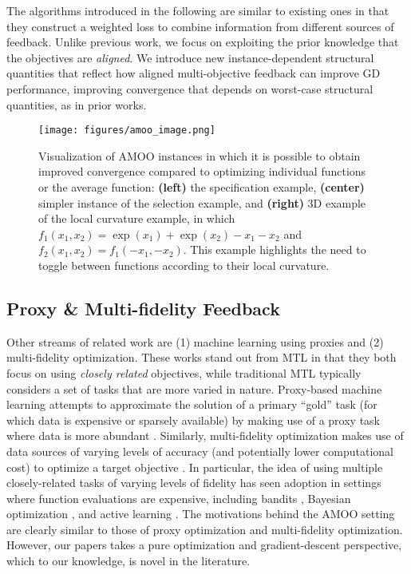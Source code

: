 The algorithms introduced in the following are similar to existing ones in that they construct a weighted loss to combine information from different sources of feedback. Unlike previous work, we focus on exploiting the prior knowledge that the objectives are \emph{aligned}.  We introduce new instance-dependent structural quantities that reflect how aligned multi-objective feedback can improve GD performance, improving convergence that depends on worst-case structural quantities, as in prior works. 


\begin{figure*}[t]
    \centering
    \texttt{[image: figures/amoo\_image.png]}
    \caption{ Visualization of AMOO instances in which it is possible to obtain improved convergence compared to optimizing individual functions or the average function: \textbf{(left)} the specification example, \textbf{(center)} simpler instance of the selection example, and \textbf{(right)} 3D example of the local curvature example, in which $f_1(x_1,x_2)=\exp(x_1)+\exp(x_2)-x_1-x_2$ and $f_2(x_1,x_2)=f_1(-x_1,-x_2)$. This example highlights the need to toggle between functions according to their local curvature.}
    \label{fig:amoo_examples}
\end{figure*}



\subsection{Proxy \& Multi-fidelity Feedback}
Other streams of related work are (1) machine learning using proxies and (2) multi-fidelity optimization. These works stand out from MTL in that they both focus on using \emph{closely related} objectives, while traditional MTL typically considers a set of tasks that are more varied in nature. Proxy-based machine learning attempts to approximate the solution of a primary ``gold'' task (for which data is expensive or sparsely available) by making use of a proxy task where data is more abundant \citep{bastani2021predicting,dzyabura2019accounting}. Similarly, multi-fidelity optimization makes use of data sources of varying levels of accuracy (and potentially lower computational cost) to optimize a target objective \citep{forrester2007multi}. In particular, the idea of using multiple closely-related tasks of varying levels of fidelity has seen adoption in settings where function evaluations are expensive, including bandits \citep{kandasamy2016multi,kandasamy2016gaussian}, Bayesian optimization \citep{kandasamy2017multi,song2019general,wu2020practical,takeno2020multi}, and active learning \citep{yi2021active,li2020deep,li2022batch}. The motivations behind the AMOO setting are clearly similar to those of proxy optimization and multi-fidelity optimization. However, our papers takes a pure optimization and gradient-descent perspective, which to our knowledge, is novel in the literature.


